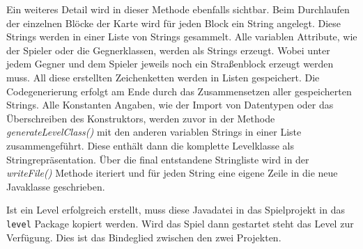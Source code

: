 Ein weiteres Detail wird in dieser Methode ebenfalls sichtbar. Beim Durchlaufen der einzelnen Blöcke der Karte wird für jeden Block ein String angelegt. Diese Strings werden in einer Liste von Strings gesammelt.\newline
Alle variablen Attribute, wie der Spieler oder die Gegnerklassen,  werden als Strings erzeugt. Wobei unter jedem Gegner und dem Spieler jeweils noch ein Straßenblock erzeugt werden muss. All diese erstellten Zeichenketten werden in Listen gespeichert. \newline
Die Codegenerierung erfolgt am Ende durch das Zusammensetzen aller gespeicherten Strings. Alle Konstanten Angaben, wie der Import von Datentypen oder das Überschreiben des Konstruktors, werden zuvor in der Methode \textit{generateLevelClass()} mit den anderen variablen Strings in einer Liste zusammengeführt. Diese enthält dann die komplette Levelklasse als Stringrepräsentation.\newline 
Über die final entstandene Stringliste wird in der \textit{writeFile()} Methode iteriert und für jeden String eine eigene Zeile in die neue Javaklasse geschrieben.

Ist ein Level erfolgreich erstellt, muss diese Javadatei in das Spielprojekt in das \texttt{level} Package kopiert werden. Wird das Spiel dann gestartet steht das Level zur Verfügung. Dies ist das Bindeglied zwischen den zwei Projekten.
